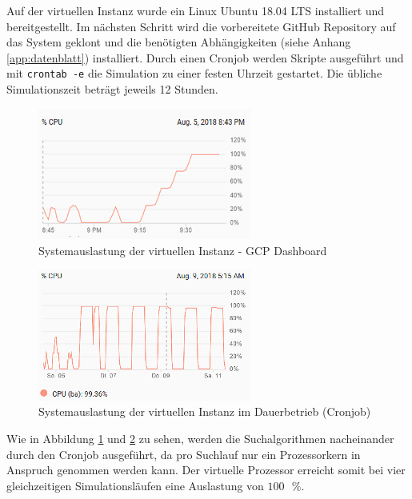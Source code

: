 	Auf der virtuellen Instanz wurde ein Linux Ubuntu 18.04 LTS installiert und bereitgestellt. Im nächsten Schritt wird die vorbereitete GitHub Repository auf das System geklont und die benötigten Abhängigkeiten (siehe Anhang \ref{app:datenblatt}) installiert. Durch einen Cronjob werden Skripte ausgeführt und mit \texttt{crontab -e} die Simulation zu einer festen Uhrzeit gestartet. Die übliche Simulationszeit beträgt jeweils 12 Stunden.\\
	\begin{minipage}[c]{0.5\textwidth}
		\begin{figure}[H] %
			\centering
			\includegraphics[width=7cm]{figures/chap_implement/GCP.png}
			\caption{Systemauslastung der virtuellen Instanz - GCP Dashboard}
			\label{fig:gcp_1}
		\end{figure}
	\end{minipage}
	\begin{minipage}[c]{0.5\textwidth}
		\begin{figure}[H] %
			\centering
			\includegraphics[width=7cm]{figures/chap_implement/GCP_2.png}
			\caption{Systemauslastung der virtuellen Instanz im Dauerbetrieb (Cronjob)}
			\label{fig:gcp_2}
		\end{figure}
	\end{minipage}\vspace{0.5cm}
	Wie in Abbildung \ref{fig:gcp_1} und \ref{fig:gcp_2} zu sehen, werden die Suchalgorithmen nacheinander durch den Cronjob ausgeführt, da pro Suchlauf nur ein Prozessorkern in Anspruch genommen werden kann. Der virtuelle Prozessor erreicht somit bei vier gleichzeitigen Simulationsläufen eine Auslastung von $100\text{ }\%$.
	
